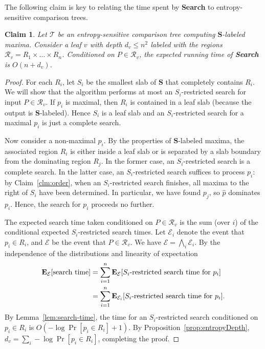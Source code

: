 \documentclass[letterpaper,11pt]{article}
\newtheorem{claim}[theorem]{Claim}
\newcommand{\EX}{\hbox{\bf E}}
\newcommand{\bS}{\textbf{S}}
\newcommand{\cR}{\mathcal{R}}
\newcommand{\cE}{\mathcal{E}}
\newcommand{\cT}{\mathcal{T}}
\begin{document}
The following claim is key to relating the time
spent by \textbf{Search} to 
entropy-sensitive comparison trees.

\begin{claim}\label{clm:search} 
  Let $\cT$ be an entropy-sensitive 
  comparison tree computing $\bS$-labeled 
  maxima.  Consider a leaf $v$ with depth
  $d_v \leq n^2$ labeled 
  with the regions $\mathcal{R}_v = 
  R_1 \times \dots \times R_n$. 
  Conditioned on $P \in \cR_v$, the 
  expected running time of 
  \textup{\textbf{Search}} is 
  $O(n + d_v)$.
\end{claim}


\begin{proof} 
For each $R_i$, let $S_i$ be the 
smallest slab of $\bS$ that completely contains 
$R_i$. We will show that the algorithm
performs at most an $S_i$-restricted search 
for input $P \in \cR_v$. 
If $p_i$ is maximal, then $R_i$ is 
contained in a leaf slab (because 
the output is $\bS$-labeled). Hence 
$S_i$ is a leaf slab and an $S_i$-restricted 
search for a maximal $p_i$ is just 
a complete search.

Now consider a non-maximal $p_i$. By the properties 
of $\bS$-labeled maxima, the associated region $R_i$ 
is either inside a leaf slab or
is separated by a slab boundary from the dominating 
region $R_j$.  In the former case, an $S_i$-restricted 
search is a complete search.
In the latter case, an $S_i$-restricted 
search suffices to process $p_i$:  
by Claim~\ref{clm:order}, when an $S_i$-restricted 
search finishes, all maxima to the right of 
$S_i$ have been determined.  In particular, we have 
found $p_j$, so $\hat p$ dominates $p_i$.
Hence, the search for $p_i$ proceeds no further.


The expected search time taken 
conditioned on $P \in \cR_v$ is 
the sum (over $i$) of the conditional 
expected $S_i$-restricted search times. 
Let $\cE_i$ denote the event that 
$p_i \in R_i$, and $\cE$ be the event 
that $P \in \cR_v$.  We have 
$\cE = \bigwedge_i \cE_i$.
By the independence of the distributions 
and linearity of expectation
\begin{align*} 
  \EX_\cE[\text{search time}] 
  &= 
  \sum_{i=1}^n \EX_\cE[\text{$S_i$-restricted search time for $p_i$}] \\
  &=  
  \sum_{i=1}^n \EX_{\cE_i} [\text{$S_i$-restricted search time for $p_i$}].
\end{align*}
By Lemma~\ref{lem:search-time}, the time 
for an $S_i$-restricted search 
conditioned on $p_i \in R_i$ is 
$O(-\log \Pr[p_i \in R_i] + 1)$. 
By Proposition~\ref{prop:entropyDepth}, 
$d_v = \sum_i -\log \Pr[p_i \in R_i]$,
completing the proof.
\end{proof}
\end{document}
